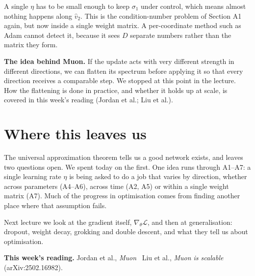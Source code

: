 \documentclass[11pt]{article}
\newcommand{\Loss}{\mathcal{L}}
\begin{document}
\noindent
A single $\eta$ has to be small enough to keep $\sigma_{1}$ under control, which means
almost nothing happens along $\hat{v}_{2}$. This is the condition-number problem of
Section A1 again, but now inside a single weight matrix. A per-coordinate method such as
Adam cannot detect it, because it sees $D$ separate numbers rather than the matrix they
form.

\begin{keybox}
\textbf{The idea behind Muon.} If the update acts with very different strength in
different directions, we can flatten its spectrum before applying it so that every
direction receives a comparable step. We stopped at this point in the lecture. How the
flattening is done in practice, and whether it holds up at scale, is covered in this
week's reading (Jordan et al.; Liu et al.).
\end{keybox}

\section*{Where this leaves us}

The universal approximation theorem tells us a good network exists, and leaves two
questions open. We spent today on the first. One idea runs through A1--A7: a single
learning rate $\eta$ is being asked to do a job that varies by direction, whether across
parameters (A4--A6), across time (A2, A5) or within a single weight matrix (A7). Much of
the progress in optimisation comes from finding another place where that assumption
fails.

\medskip
\noindent
Next lecture we look at the gradient itself, $\nabla_\theta \Loss$, and then at
generalisation: dropout, weight decay, grokking and double descent, and what they tell us
about optimisation.

\vspace{0.6em}
\noindent\textbf{\color{accent}This week's reading.}
Jordan et al., \emph{Muon} \textbullet\ Liu et al., \emph{Muon is scalable}
(arXiv:2502.16982).
\end{document}
